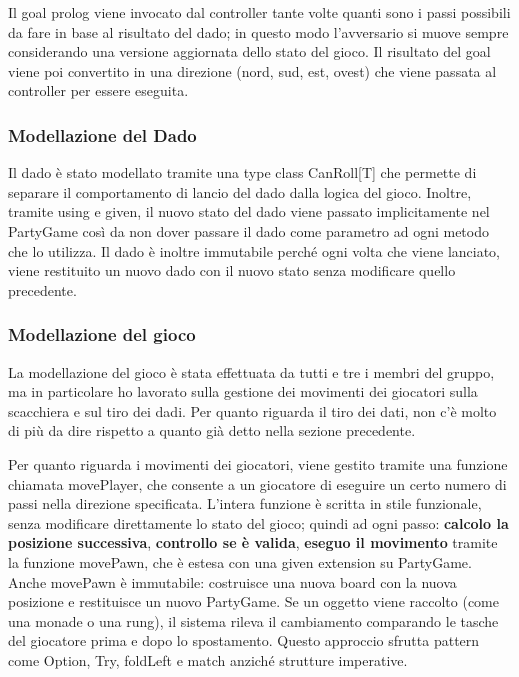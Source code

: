 Il goal prolog viene invocato dal controller tante volte quanti sono i passi possibili da fare in base al risultato del dado; in 
questo modo l'avversario si muove sempre considerando una versione aggiornata dello stato del gioco. Il risultato del goal viene
poi convertito in una direzione (nord, sud, est, ovest) che viene passata al controller per essere eseguita.

\subsubsection{Modellazione del Dado}
Il dado è stato modellato tramite una type class CanRoll[T] che permette di separare il comportamento di lancio del dado dalla
logica del gioco. Inoltre, tramite using e given, il nuovo stato del dado viene passato implicitamente nel PartyGame così da non
dover passare il dado come parametro ad ogni metodo che lo utilizza. Il dado è inoltre immutabile perché ogni volta che viene
lanciato, viene restituito un nuovo dado con il nuovo stato senza modificare quello precedente.

\subsubsection{Modellazione del gioco}
La modellazione del gioco è stata effettuata da tutti e tre i membri del gruppo, ma in particolare ho lavorato sulla gestione
dei movimenti dei giocatori sulla scacchiera e sul tiro dei dadi. Per quanto riguarda il tiro dei dati, non c'è molto di più
da dire rispetto a quanto già detto nella sezione precedente.

Per quanto riguarda i movimenti dei giocatori, viene gestito tramite una funzione chiamata movePlayer, che consente a un giocatore
di eseguire un certo numero di passi nella direzione specificata.
L'intera funzione è scritta in stile funzionale, senza modificare direttamente lo stato del gioco; quindi ad ogni passo:
\textbf{calcolo la posizione successiva}, \textbf{controllo se è valida}, \textbf{eseguo il movimento} tramite la funzione movePawn,
che è estesa con una given extension su PartyGame. Anche movePawn è immutabile: costruisce una nuova board con la nuova posizione e
restituisce un nuovo PartyGame. Se un oggetto viene raccolto (come una monade o una rung), il sistema rileva il cambiamento
comparando le tasche del giocatore prima e dopo lo spostamento. Questo approccio sfrutta pattern come Option, Try, foldLeft e match
anziché strutture imperative.

